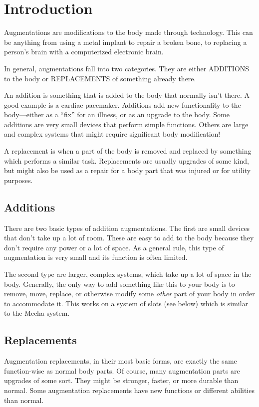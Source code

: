 \section{Introduction}

Augmentations are modifications to the body made through technology. 
This can be anything from using a metal implant to repair a broken bone, to 
replacing a person's brain with a computerized electronic brain.

In general, augmentations fall into two categories.  They are either 
ADDITIONS to the body or REPLACEMENTS of something already there.  

An addition is something that is added to the body that normally isn't there.
A good example is a cardiac pacemaker.  Additions add new functionality to the 
body---either as a ``fix'' for an illness, or as an upgrade to the body.  Some 
additions are very small devices that perform simple functions.  Others are 
large and complex systems that might require significant body modification!

A replacement is when a part of the body is removed and replaced by something 
which performs a similar task.  Replacements are usually upgrades of some kind, 
but might also be used as a repair for a body part that was injured or for 
utility purposes.

\subsection{Additions}

There are two basic types of addition augmentations.  The first are small 
devices that don't take up a lot of room.  These are easy to add to the body 
because they don't require any power or a lot of space.  As a general rule, 
this type of augmentation is very small and its function is often limited.

The second type are larger, complex systems, which take up a lot of space in 
the body.  Generally, the only way to add something like this to your body is 
to remove, move, replace, or otherwise modify some \emph{other}
part of your body in 
order to accommodate it.  This works on a system of slots (see below) which is 
similar to the Mecha system.

\subsection{Replacements}

Augmentation replacements, in their most basic forms, are exactly the same 
function-wise as normal body parts.  Of course, many augmentation parts are 
upgrades of some sort.  They might be stronger, faster, or more durable than 
normal.  Some augmentation replacements have new functions or different 
abilities than normal.


